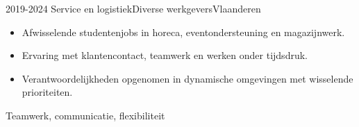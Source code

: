 \begin{ervaringen}
    \ervaring
    {2019-2024}
    {Service en logistiek}{Diverse werkgevers}{Vlaanderen}
    {}
    {
        \begin{itemize}
            \item Afwisselende studentenjobs in horeca, eventondersteuning en magazijnwerk.
            \item Ervaring met klantencontact, teamwerk en werken onder tijdsdruk.
            \item Verantwoordelijkheden opgenomen in dynamische omgevingen met wisselende prioriteiten.
        \end{itemize}
    }
    {Teamwerk, communicatie, flexibiliteit}
\end{ervaringen}
